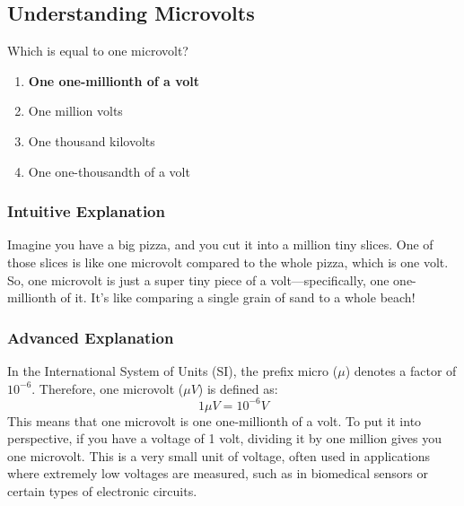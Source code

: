 \subsection{Understanding Microvolts}
\label{T5B04}

\begin{tcolorbox}[colback=gray!10!white,colframe=black!75!black,title=T5B04]
Which is equal to one microvolt?
\begin{enumerate}[label=\Alph*)]
    \item \textbf{One one-millionth of a volt}
    \item One million volts
    \item One thousand kilovolts
    \item One one-thousandth of a volt
\end{enumerate}
\end{tcolorbox}

\subsubsection{Intuitive Explanation}
Imagine you have a big pizza, and you cut it into a million tiny slices. One of those slices is like one microvolt compared to the whole pizza, which is one volt. So, one microvolt is just a super tiny piece of a volt—specifically, one one-millionth of it. It's like comparing a single grain of sand to a whole beach!

\subsubsection{Advanced Explanation}
In the International System of Units (SI), the prefix micro ($\mu$) denotes a factor of \(10^{-6}\). Therefore, one microvolt (\(\mu V\)) is defined as:
\[
1 \mu V = 10^{-6} V
\]
This means that one microvolt is one one-millionth of a volt. To put it into perspective, if you have a voltage of 1 volt, dividing it by one million gives you one microvolt. This is a very small unit of voltage, often used in applications where extremely low voltages are measured, such as in biomedical sensors or certain types of electronic circuits.

